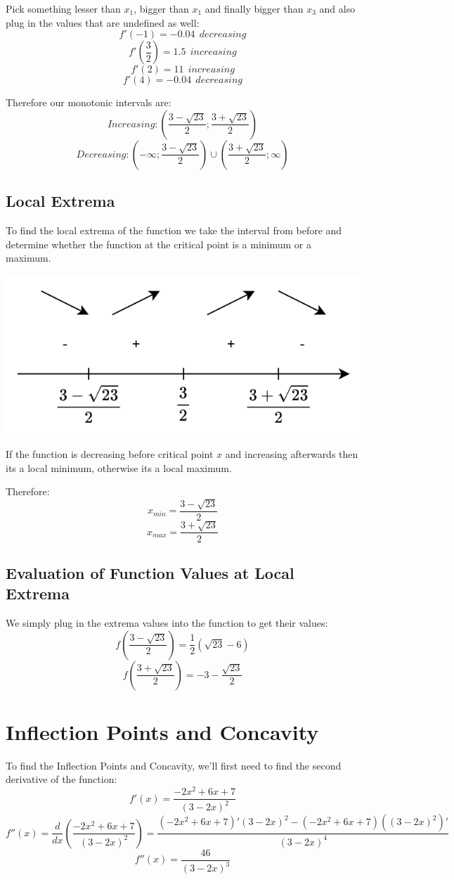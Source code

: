\documentclass[11pt]{article}
\begin{document}
Pick something lesser than \(x_1\), bigger than \(x_1\) and finally bigger than \(x_3\) and also plug in the values that are undefined as well:
\newpage
\[
f'(-1) = -0.04 \ \ decreasing 
\]
\[
f'(\frac{3}{2}) = 1.5 \ \ increasing
\]
\[
f'(2) = 11 \ \ increasing
\]
\[
f'(4) = -0.04 \ \ decreasing
\]

Therefore our monotonic intervals are:
\[
Increasing: \left( \frac{3-\sqrt{23}}{2} ; \frac{3+\sqrt{23}}{2} \right)
\]
\[
Decreasing: \left( -\infty ; \frac{3 - \sqrt{23}}{2} \right) \cup \left( \frac{3 + \sqrt{23}}{2} ; \infty \right)
\]
\subsection{Local Extrema}
\label{sec:org415f045}
To find the local extrema of the function we take the interval from before and determine whether the function at the critical point is a minimum or a maximum.
\begin{center}
\includegraphics[width=.9\linewidth]{./skarmbild.png}
\end{center}

If the function is decreasing before critical point \(x\) and increasing afterwards then its a local minimum, otherwise its a local maximum.

Therefore:
\[
x_{min} = \frac{3-\sqrt{23}}{2}
\]
\[
x_{max} = \frac{3+\sqrt{23}}{2}
\]
\subsection{Evaluation of Function Values at Local Extrema}
\label{sec:org0530f9b}
We simply plug in the extrema values into the function to get their values:
\[
f(\frac{3-\sqrt{23}}{2}) = \frac{1}{2} \left( \sqrt{23} - 6 \right)
\]
\[
f(\frac{3+\sqrt{23}}{2}) = -3-\frac{\sqrt{23}}{2}
\]
\section{Inflection Points and Concavity}
\label{sec:org9c19472}
To find the Inflection Points and Concavity, we'll first need to find the second derivative of the function:
\[
f'(x) = \frac{-2x^2+6x+7}{(3-2x)^2}
\]
\[
f''(x) = \frac{d}{dx} \left( \frac{-2x^2+6x+7}{(3-2x)^2} \right) = \frac{\left( -2x^2+6x+7 \right)' \left( 3-2x \right)^2 - \left( -2x^2+6x+7 \right) \left(\left( 3 - 2x\right)^2\right)'}{\left(3-2x\right)^4}
\]
\[
f''(x) = \frac{46}{(3-2x)^3}
\]
\end{document}
